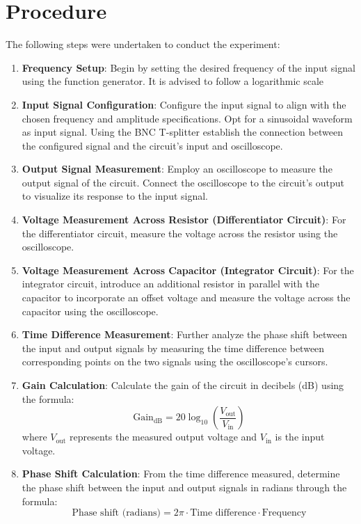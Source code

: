 \section{Procedure}
The following steps were undertaken to conduct the experiment:

\begin{enumerate}

    \item \textbf{Frequency Setup}: 
    Begin by setting the desired frequency of the input signal using the function generator. It is advised to follow a logarithmic scale
    
    \item \textbf{Input Signal Configuration}: 
    Configure the input signal to align with the chosen frequency and amplitude specifications. Opt for a sinusoidal waveform as input signal. 
    Using the BNC T-splitter establish the connection between the configured signal and the circuit's input and oscilloscope.
    
    \item \textbf{Output Signal Measurement}: 
    Employ an oscilloscope to measure the output signal of the circuit. Connect the oscilloscope to the circuit's output to visualize its response to the input signal.
    
    \item \textbf{Voltage Measurement Across Resistor (Differentiator Circuit)}: 
    For the differentiator circuit, measure the voltage across the resistor using the oscilloscope. 
    
    \item \textbf{Voltage Measurement Across Capacitor (Integrator Circuit)}: 
    For the integrator circuit, introduce an additional resistor in parallel with the capacitor to incorporate an offset voltage and measure the voltage across the capacitor using the oscilloscope. 
    
    \item \textbf{Time Difference Measurement}: 
    Further analyze the phase shift between the input and output signals by measuring the time difference between corresponding points on the two signals using the oscilloscope's cursors.
    
    \item \textbf{Gain Calculation}: 
    Calculate the gain of the circuit in decibels (dB) using the formula: $$ \text{Gain}_{\text{dB}} = 20 \log_{10} \left( \frac{V_{\text{out}}}{V_{\text{in}}} \right) $$
    where $V_{\text{out}}$ represents the measured output voltage and $V_{\text{in}}$ is the input voltage.
    
    \item \textbf{Phase Shift Calculation}: 
    From the time difference measured, determine the phase shift between the input and output signals in radians through the formula:
    $$ \text{Phase shift (radians)} = 2\pi \cdot \text{Time difference} \cdot \text{Frequency}$$

\end{enumerate}
